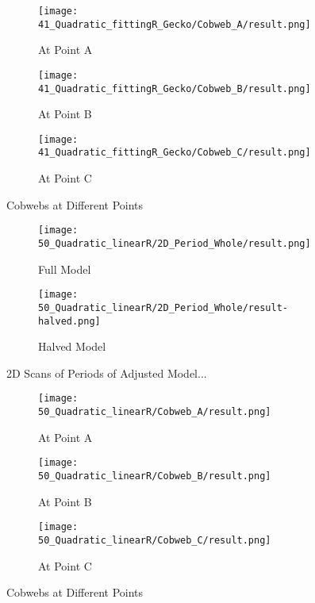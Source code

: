 \begin{figure}
	\centering
	\begin{subfigure}{0.3\textwidth}
		\centering
		\texttt{[image: 41\_Quadratic\_fittingR\_Gecko/Cobweb\_A/result.png]}
		\caption{At Point A}
		\label{fig:quad.full.fit.2.CobwebA}
	\end{subfigure}
	\begin{subfigure}{0.3\textwidth}
		\centering
		\texttt{[image: 41\_Quadratic\_fittingR\_Gecko/Cobweb\_B/result.png]}
		\caption{At Point B}
		\label{fig:quad.full.fit.2.CobwebB}
	\end{subfigure}
	\begin{subfigure}{0.3\textwidth}
		\centering
		\texttt{[image: 41\_Quadratic\_fittingR\_Gecko/Cobweb\_C/result.png]}
		\caption{At Point C}
		\label{fig:quad.full.fit.2.CobwebC}
	\end{subfigure}
	\caption{Cobwebs at Different Points}
	\label{fig:quad.full.fit.2.Cobwebs}
\end{figure}

\begin{figure}
	\centering
	\begin{subfigure}{0.4\textwidth}
		\centering
		\texttt{[image: 50\_Quadratic\_linearR/2D\_Period\_Whole/result.png]}
		\caption{Full Model}
		\label{fig:quadratic.full.fit.lin.period.full}
	\end{subfigure}
	\begin{subfigure}{0.4\textwidth}
		\centering
		\texttt{[image: 50\_Quadratic\_linearR/2D\_Period\_Whole/result-halved.png]}
		\caption{Halved Model}
		\label{fig:quadratic.full.fit.lin.period.halved}
	\end{subfigure}
	\caption{2D Scans of Periods of Adjusted Model...}
\end{figure}

\begin{figure}
	\centering
	\begin{subfigure}{0.3\textwidth}
		\centering
		\texttt{[image: 50\_Quadratic\_linearR/Cobweb\_A/result.png]}
		\caption{At Point A}
		\label{fig:quad.full.fit.lin.CobwebA}
	\end{subfigure}
	\begin{subfigure}{0.3\textwidth}
		\centering
		\texttt{[image: 50\_Quadratic\_linearR/Cobweb\_B/result.png]}
		\caption{At Point B}
		\label{fig:quad.full.fit.lin.CobwebB}
	\end{subfigure}
	\begin{subfigure}{0.3\textwidth}
		\centering
		\texttt{[image: 50\_Quadratic\_linearR/Cobweb\_C/result.png]}
		\caption{At Point C}
		\label{fig:quad.full.fit.lin.CobwebC}
	\end{subfigure}
	\caption{Cobwebs at Different Points}
	\label{fig:quad.full.fit.lin.Cobwebs}
\end{figure}

